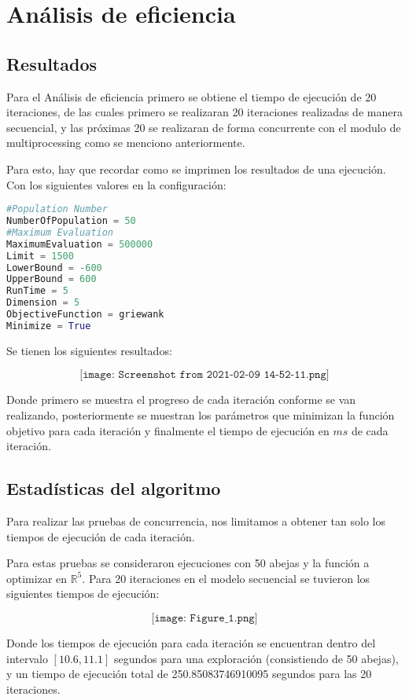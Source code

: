 \documentclass{article}
\begin{document}
\newpage
\section{Análisis de eficiencia}

\subsection{Resultados}

Para el Análisis de eficiencia primero se obtiene el tiempo de ejecución de 20 iteraciones, de las cuales primero se realizaran 20 iteraciones realizadas de manera secuencial, y las próximas 20 se realizaran de forma concurrente con el modulo de multiprocessing como se menciono anteriormente. 


Para esto, hay que recordar como se imprimen los resultados de una ejecución. Con los siguientes valores en la configuración:

\begin{lstlisting}[language=Python]
#Population Number
NumberOfPopulation = 50
#Maximum Evaluation
MaximumEvaluation = 500000
Limit = 1500
LowerBound = -600
UpperBound = 600
RunTime = 5
Dimension = 5
ObjectiveFunction = griewank
Minimize = True
\end{lstlisting} 

Se tienen los siguientes resultados:

$$\texttt{[image: Screenshot from 2021-02-09 14-52-11.png]}$$
 
Donde primero se muestra el progreso de cada iteración conforme se van realizando, posteriormente se muestran los parámetros que minimizan la función objetivo para cada iteración y finalmente el tiempo de ejecución en $ms$ de cada iteración. 

\subsection{Estadísticas del algoritmo}

Para realizar las pruebas de concurrencia, nos limitamos a obtener tan solo los tiempos de ejecución de cada iteración.

Para estas pruebas se consideraron ejecuciones con 50 abejas y la función a optimizar  en $\mathbb{R}^5$. Para 20 iteraciones en el modelo secuencial se tuvieron los siguientes tiempos de ejecución:

$$\texttt{[image: Figure\_1.png]}$$

Donde los tiempos de ejecución para cada iteración se encuentran dentro del intervalo $[10.6,11.1]$ segundos para una exploración (consistiendo de 50 abejas), y un tiempo de ejecución total de 250.85083746910095 segundos para las 20 iteraciones. 
\end{document}
